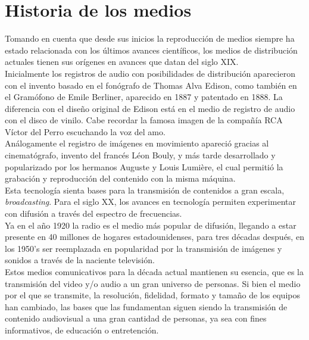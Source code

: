 \section{Historia de los medios}
Tomando en cuenta que desde sus inicios la reproducción de medios siempre ha estado relacionada con los últimos avances científicos, los medios de distribución actuales tienen sus orígenes en avances que datan  del siglo XIX.\\

Inicialmente los registros de audio con posibilidades de distribución aparecieron con el invento basado en el fonógrafo de Thomas Alva Edison, como también en el Gramófono de Emile Berliner, aparecido en 1887 y patentado en 1888. La diferencia con el diseño original de Edison está en el medio de registro de audio con el disco de vinilo. Cabe recordar la famosa imagen de la compañía RCA Víctor del Perro escuchando la voz del amo.\\

Análogamente el registro de imágenes en movimiento apareció gracias al cinematógrafo, invento del francés Léon Bouly, y más tarde desarrollado y popularizado por los hermanos Auguste y Louis Lumière, el cual permitió la grabación y reproducción del contenido con la misma máquina.\\

Esta tecnología sienta bases para la transmisión de contenidos a gran escala, \textit{broadcasting}. Para el siglo XX, los avances en tecnología permiten experimentar con difusión a través del espectro de frecuencias.\\

 Ya en el año 1920 la radio es el medio más popular de difusión, llegando a estar presente en 40 millones de hogares estadounidenses, para tres décadas después, en los 1950’s ser reemplazada en popularidad por la transmisión de imágenes y sonidos a través de la naciente televisión.\\

	Estos medios comunicativos para la década actual mantienen su esencia, que es la transmisión del video y/o audio a un gran universo de personas. Si bien el medio por el que se transmite, la resolución, fidelidad, formato y tamaño de los equipos han cambiado, las bases que las fundamentan siguen siendo la transmisión de contenido audiovisual a una gran cantidad de personas, ya sea con fines informativos, de educación o entretención.\\
	
